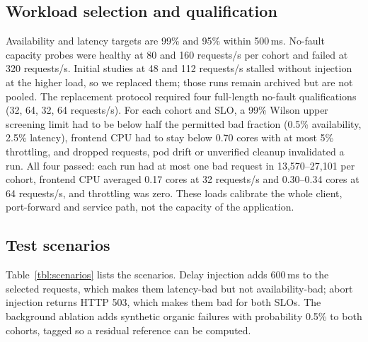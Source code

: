 \documentclass[a4paper,fleqn,11pt]{cas-dc}
\begin{document}
\subsection{Workload selection and qualification}
Availability and latency targets are 99\% and 95\% within 500\,ms. No-fault capacity probes were healthy at 80 and 160 requests/s per cohort and failed at 320 requests/s. Initial studies at 48 and 112 requests/s stalled without injection at the higher load, so we replaced them; those runs remain archived but are not pooled. The replacement protocol required four full-length no-fault qualifications (32, 64, 32, 64 requests/s). For each cohort and SLO, a 99\% Wilson upper screening limit had to be below half the permitted bad fraction (0.5\% availability, 2.5\% latency), frontend CPU had to stay below 0.70 cores with at most 5\% throttling, and dropped requests, pod drift or unverified cleanup invalidated a run. All four passed: each run had at most one bad request in 13,570--27,101 per cohort, frontend CPU averaged 0.17 cores at 32 requests/s and 0.30--0.34 cores at 64 requests/s, and throttling was zero. These loads calibrate the whole client, port-forward and service path, not the capacity of the application.

\subsection{Test scenarios}
Table~\ref{tbl:scenarios} lists the scenarios. Delay injection adds 600\,ms to the selected requests, which makes them latency-bad but not availability-bad; abort injection returns HTTP 503, which makes them bad for both SLOs. The background ablation adds synthetic organic failures with probability 0.5\% to both cohorts, tagged so a residual reference can be computed.
\end{document}
